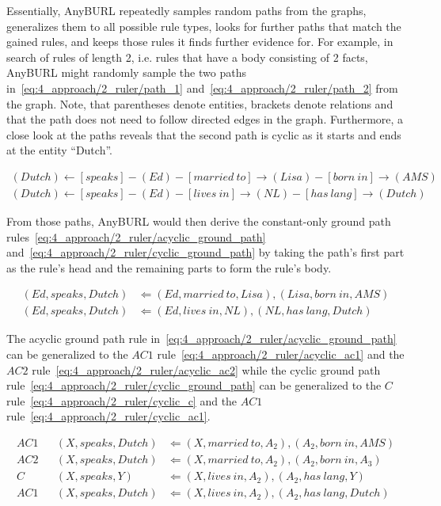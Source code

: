 Essentially, AnyBURL repeatedly samples random paths from the graphs, generalizes them to all possible rule types, looks for further paths that match the gained rules, and keeps those rules it finds further evidence for. For example, in search of rules of length 2, i.e. rules that have a body consisting of 2 facts, AnyBURL might randomly sample the two paths in~\ref{eq:4_approach/2_ruler/path_1} and~\ref{eq:4_approach/2_ruler/path_2} from the graph. Note, that parentheses denote entities, brackets denote relations and that the path does not need to follow directed edges in the graph. Furthermore, a close look at the paths reveals that the second path is cyclic as it starts and ends at the entity ``Dutch''.

\begin{align}
(Dutch)
    \leftarrow [speaks] - (Ed) - [married~to] \rightarrow (Lisa) - [born~in] \rightarrow (AMS)
    \label{eq:4_approach/2_ruler/path_1} \\
    (Dutch) \leftarrow [speaks] - (Ed) - [lives~in] \rightarrow (NL) - [has~lang] \rightarrow (Dutch)
    \label{eq:4_approach/2_ruler/path_2}
\end{align}

From those paths, AnyBURL would then derive the constant-only
ground path rules~\ref{eq:4_approach/2_ruler/acyclic_ground_path} and~\ref{eq:4_approach/2_ruler/cyclic_ground_path} by taking the path's first part as the rule's head and the remaining parts to form the rule's body.

\begin{align}
(Ed, speaks, Dutch)
    &\Leftarrow (Ed, married~to, Lisa), (Lisa, born~in, AMS)
    \label{eq:4_approach/2_ruler/acyclic_ground_path} \\
    (Ed, speaks, Dutch) &\Leftarrow (Ed, lives~in, NL), (NL, has~lang, Dutch)
    \label{eq:4_approach/2_ruler/cyclic_ground_path}
\end{align}

The acyclic ground path rule in~\ref{eq:4_approach/2_ruler/acyclic_ground_path} can be generalized to the $AC1$ rule~\ref{eq:4_approach/2_ruler/acyclic_ac1} and the $AC2$ rule~\ref{eq:4_approach/2_ruler/acyclic_ac2} while the cyclic ground path rule~\ref{eq:4_approach/2_ruler/cyclic_ground_path} can be generalized to the $C$ rule~\ref{eq:4_approach/2_ruler/cyclic_c} and the $AC1$ rule~\ref{eq:4_approach/2_ruler/cyclic_ac1}.

\begin{align}
    AC1 && (X, speaks, Dutch) &\Leftarrow (X, married~to, A_2), (A_2, born~in, AMS)
    \label{eq:4_approach/2_ruler/acyclic_ac1} \\
    AC2 && (X, speaks, Dutch) &\Leftarrow (X, married~to, A_2), (A_2, born~in, A_3)
    \label{eq:4_approach/2_ruler/acyclic_ac2} \\
        C   && (X, speaks, Y) &\Leftarrow (X, lives~in, A_2), (A_2, has~lang, Y)
    \label{eq:4_approach/2_ruler/cyclic_c} \\
    AC1 && (X, speaks, Dutch) &\Leftarrow (X, lives~in, A_2), (A_2, has~lang, Dutch)
    \label{eq:4_approach/2_ruler/cyclic_ac1}
\end{align}

